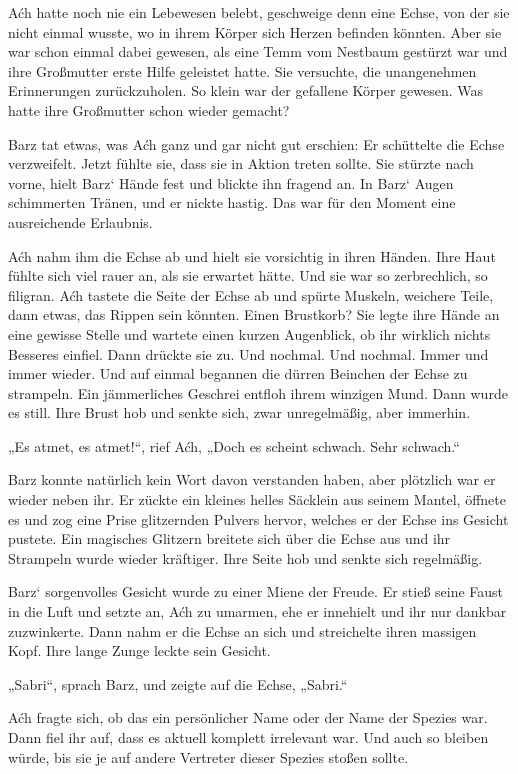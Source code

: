 Aćh hatte noch nie ein Lebewesen belebt, geschweige denn eine Echse, von der sie nicht einmal wusste, wo in ihrem Körper sich Herzen befinden könnten. Aber sie war schon einmal dabei gewesen, als eine Temm vom Nestbaum gestürzt war und ihre Großmutter erste Hilfe geleistet hatte. Sie versuchte, die unangenehmen Erinnerungen zurückzuholen. So klein war der gefallene Körper gewesen. Was hatte ihre Großmutter schon wieder gemacht?

Barz tat etwas, was Aćh ganz und gar nicht gut erschien: Er schüttelte die Echse verzweifelt. Jetzt fühlte sie, dass sie in Aktion treten sollte. Sie stürzte nach vorne, hielt Barz‘ Hände fest und blickte ihn fragend an. In Barz‘ Augen schimmerten Tränen, und er nickte hastig. Das war für den Moment eine ausreichende Erlaubnis.

Aćh nahm ihm die Echse ab und hielt sie vorsichtig in ihren Händen. Ihre Haut fühlte sich viel rauer an, als sie erwartet hätte. Und sie war so zerbrechlich, so filigran. Aćh tastete die Seite der Echse ab und spürte Muskeln, weichere Teile, dann etwas, das Rippen sein könnten. Einen Brustkorb? Sie legte ihre Hände an eine gewisse Stelle und wartete einen kurzen Augenblick, ob ihr wirklich nichts Besseres einfiel. Dann drückte sie zu. Und nochmal. Und nochmal. Immer und immer wieder. Und auf einmal begannen die dürren Beinchen der Echse zu strampeln. Ein jämmerliches Geschrei entfloh ihrem winzigen Mund. Dann wurde es still. Ihre Brust hob und senkte sich, zwar unregelmäßig, aber immerhin.

„Es atmet, es atmet!“, rief Aćh, „Doch es scheint schwach. Sehr schwach.“

Barz konnte natürlich kein Wort davon verstanden haben, aber plötzlich war er wieder neben ihr. Er zückte ein kleines helles Säcklein aus seinem Mantel, öffnete es und zog eine Prise glitzernden Pulvers hervor, welches er der Echse ins Gesicht pustete. Ein magisches Glitzern breitete sich über die Echse aus und ihr Strampeln wurde wieder kräftiger. Ihre Seite hob und senkte sich regelmäßig.

Barz‘ sorgenvolles Gesicht wurde zu einer Miene der Freude. Er stieß seine Faust in die Luft und setzte an, Aćh zu umarmen, ehe er innehielt und ihr nur dankbar zuzwinkerte. Dann nahm er die Echse an sich und streichelte ihren massigen Kopf. Ihre lange Zunge leckte sein Gesicht.

„Sabri“, sprach Barz, und zeigte auf die Echse, „Sabri.“

Aćh fragte sich, ob das ein persönlicher Name oder der Name der Spezies war. Dann fiel ihr auf, dass es aktuell komplett irrelevant war. Und auch so bleiben würde, bis sie je auf andere Vertreter dieser Spezies stoßen sollte.

